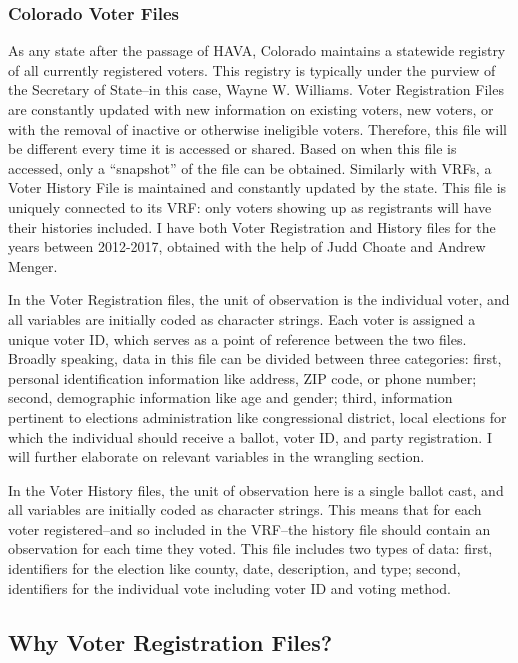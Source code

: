 \documentclass[12pt,twoside]{reedthesis}
\begin{document}
  \subsubsection{Colorado Voter Files}\label{colorado-voter-files}
  
  As any state after the passage of HAVA, Colorado maintains a statewide
  registry of all currently registered voters. This registry is typically
  under the purview of the Secretary of State--in this case, Wayne W.
  Williams. Voter Registration Files are constantly updated with new
  information on existing voters, new voters, or with the removal of
  inactive or otherwise ineligible voters. Therefore, this file will be
  different every time it is accessed or shared. Based on when this file
  is accessed, only a ``snapshot'' of the file can be obtained. Similarly
  with VRFs, a Voter History File is maintained and constantly updated by
  the state. This file is uniquely connected to its VRF: only voters
  showing up as registrants will have their histories included. I have
  both Voter Registration and History files for the years between
  2012-2017, obtained with the help of Judd Choate and Andrew Menger.
  
  In the Voter Registration files, the unit of observation is the
  individual voter, and all variables are initially coded as character
  strings. Each voter is assigned a unique voter ID, which serves as a
  point of reference between the two files. Broadly speaking, data in this
  file can be divided between three categories: first, personal
  identification information like address, ZIP code, or phone number;
  second, demographic information like age and gender; third, information
  pertinent to elections administration like congressional district, local
  elections for which the individual should receive a ballot, voter ID,
  and party registration. I will further elaborate on relevant variables
  in the wrangling section.
  
  In the Voter History files, the unit of observation here is a single
  ballot cast, and all variables are initially coded as character strings.
  This means that for each voter registered--and so included in the
  VRF--the history file should contain an observation for each time they
  voted. This file includes two types of data: first, identifiers for the
  election like county, date, description, and type; second, identifiers
  for the individual vote including voter ID and voting method.
  
  \subsection{Why Voter Registration
  Files?}\label{why-voter-registration-files}
  
\end{document}
